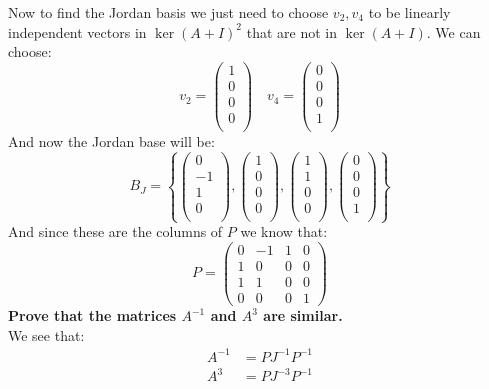 \documentclass[11pt,a4paper]{article}
\theoremstyle{plain}
\begin{document}
	Now to find the Jordan basis we just need to choose $v_2, v_4$ to
	be linearly independent vectors in $\ker(A+I)^2$ that are not in
	$\ker(A+I)$. We can choose:
	\[
		v_2 = \begin{pmatrix}1 \\ 0\\ 0\\ 0\\ \end{pmatrix} \quad
		v_4 = \begin{pmatrix}0 \\ 0\\ 0\\ 1\\ \end{pmatrix}
	\]
	And now the Jordan base will be:
	\[
		B_J = 
		\left\{
		\begin{pmatrix}0 \\ -1\\ 1\\ 0\\ \end{pmatrix},
		\begin{pmatrix}1 \\ 0\\ 0\\ 0\\ \end{pmatrix},
		\begin{pmatrix}1 \\ 1\\ 0\\ 0\\ \end{pmatrix},
		\begin{pmatrix}0 \\ 0\\ 0\\ 1\\ \end{pmatrix}
		\right\}
	\]
	And since these are the columns of $P$ we know that:
	\[
		P = 
		\left(\begin{matrix}
		0 & -1 & 1 & 0 \\
		1 & 0 & 0 & 0 \\
		1 & 1 & 0 & 0 \\
		0 & 0 & 0 & 1
		\end{matrix}\right)
	\]
	\newpage
	\noindent
	\textbf{Prove that the matrices $A^{-1}$ and $A^3$ are similar.} \\
	We see that:
	\begin{align*}
		A^{-1} &= PJ^{-1}P^{-1} \\
		A^{3}  &= PJ^{-3}P^{-1}
	\end{align*}
\end{document}
